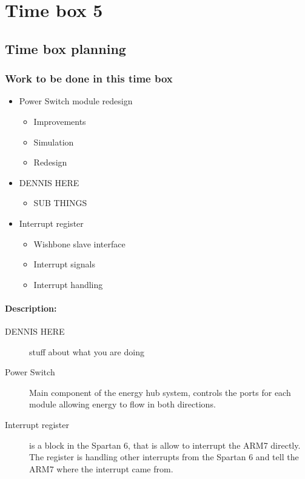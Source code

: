 \section{Time box 5} 
\listoftodos
\subsection{Time box planning}
\begin{figure}[H]
	\begin{centering}
	\end{centering}
\end{figure}
\subsubsection{Work to be done in this time box}
\begin{itemize}
	\item Power Switch module redesign
	\begin{itemize}
		\item Improvements
		\item Simulation
		\item Redesign
	\end{itemize}
	\item DENNIS HERE
		\begin{itemize}
			\item SUB THINGS
		\end{itemize}
	\item Interrupt register
	\begin{itemize}
		\item Wishbone slave interface
		\item Interrupt signals
		\item Interrupt handling
	\end{itemize}
\end{itemize}
\paragraph{Description:}
\begin{description}
	\item[DENNIS HERE] stuff about what you are doing
	\item[Power Switch] Main component of the energy hub system, controls the ports for each module allowing energy to flow in both directions.
	\item[Interrupt register] is a block in the Spartan 6, that is allow to interrupt the ARM7 directly. The register is handling other interrupts from the Spartan 6 and tell the ARM7 where the interrupt came from.
\end{description}
